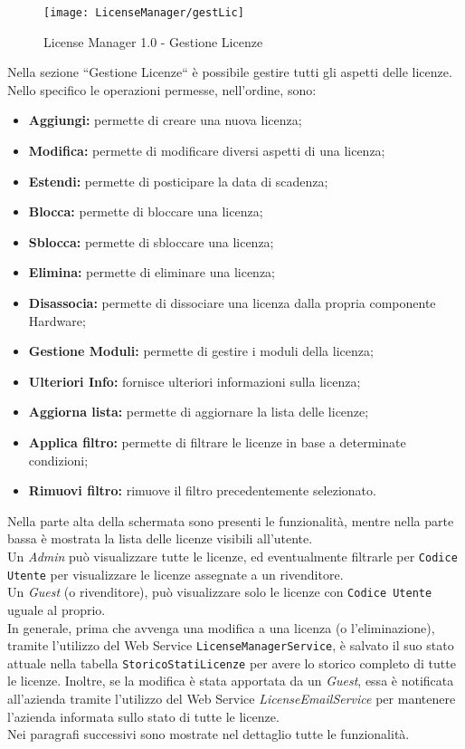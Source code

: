 \begin{figure}[!h] 
    \centering 
    \texttt{[image: LicenseManager/gestLic]} 
    \caption{License Manager 1.0 - Gestione Licenze}
\label{gestLic}
\end{figure}

Nella sezione “Gestione Licenze“ è possibile gestire tutti gli aspetti delle licenze.
Nello specifico le operazioni permesse, nell'ordine, sono:
\begin{itemize}
\item \textbf{Aggiungi:} permette di creare una nuova licenza;
\item \textbf{Modifica:} permette di modificare diversi aspetti di una licenza;
\item \textbf{Estendi:} permette di posticipare la data di scadenza;
\item \textbf{Blocca:} permette di bloccare una licenza;
\item \textbf{Sblocca:} permette di sbloccare una licenza;
\item \textbf{Elimina:} permette di eliminare una licenza;
\item \textbf{Disassocia:} permette di dissociare una licenza dalla propria componente Hardware;
\item \textbf{Gestione Moduli:} permette di gestire i moduli della licenza;
\item \textbf{Ulteriori Info:} fornisce ulteriori informazioni sulla licenza;
\item \textbf{Aggiorna lista:} permette di aggiornare la lista delle licenze;
\item \textbf{Applica filtro:} permette di filtrare le licenze in base a determinate condizioni;
\item \textbf{Rimuovi filtro:} rimuove il filtro precedentemente selezionato.
\end{itemize} 
Nella parte alta della schermata sono presenti le funzionalità, mentre nella parte bassa è mostrata la lista delle licenze visibili all’utente.
\\
Un \textit{Admin} può visualizzare tutte le licenze, ed eventualmente filtrarle per \texttt{Codice Utente} per visualizzare le licenze assegnate a un rivenditore.
\\
Un \textit{Guest} (o rivenditore), può visualizzare solo le licenze con \texttt{Codice Utente} uguale al proprio.
\\

In generale, prima che avvenga una modifica a una licenza (o l'eliminazione), tramite l'utilizzo del Web Service \texttt{LicenseManagerService}, è salvato il suo stato attuale nella tabella \texttt{StoricoStatiLicenze} per avere lo storico completo di tutte le licenze. Inoltre, se la modifica è stata apportata da un \textit{Guest}, essa è notificata all'azienda tramite l'utilizzo del Web Service \textit{LicenseEmailService} per mantenere l'azienda informata sullo stato di tutte le licenze. 
\\Nei paragrafi successivi sono mostrate nel dettaglio tutte le funzionalità. 


